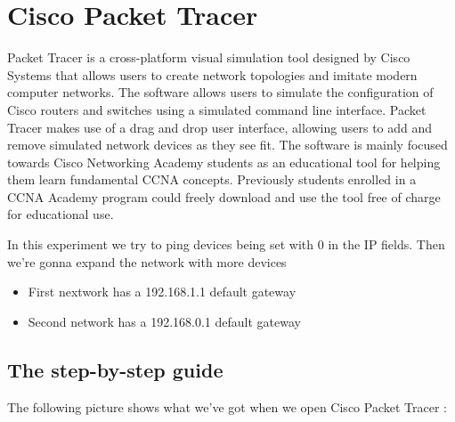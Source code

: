 \documentclass[a4paper,12pt]{article}
\begin{document}
\section{Cisco Packet Tracer}

Packet Tracer is a cross-platform visual simulation tool designed by Cisco Systems that allows users to create network topologies and imitate modern computer networks. The software allows users to simulate the configuration of Cisco routers and switches using a simulated command line interface. Packet Tracer makes use of a drag and drop user interface, allowing users to add and remove simulated network devices as they see fit. The software is mainly focused towards Cisco Networking Academy students as an educational tool for helping them learn fundamental CCNA concepts. Previously students enrolled in a CCNA Academy program could freely download and use the tool free of charge for educational use.\footnotemark{} \newline

In this experiment we try to ping devices being set with 0 in the IP fields. Then we're gonna expand the network with more devices


\begin{itemize}
\item{First nextwork has a 192.168.1.1 default gateway}
\item{Second network has a 192.168.0.1 default gateway}
\end{itemize}

\clearpage

\subsection{The step-by-step guide}

The following picture shows what we've got when we open Cisco Packet Tracer : \newline
\end{document}
